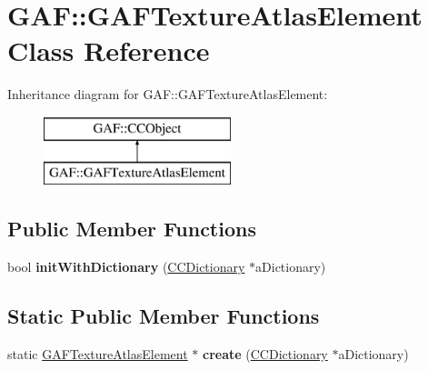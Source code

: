 \hypertarget{class_g_a_f_1_1_g_a_f_texture_atlas_element}{\section{G\-A\-F\-:\-:G\-A\-F\-Texture\-Atlas\-Element Class Reference}
\label{class_g_a_f_1_1_g_a_f_texture_atlas_element}
}
Inheritance diagram for G\-A\-F\-:\-:G\-A\-F\-Texture\-Atlas\-Element\-:\begin{figure}[H]
\begin{center}
\leavevmode
\includegraphics[height=2.000000cm]{class_g_a_f_1_1_g_a_f_texture_atlas_element}
\end{center}
\end{figure}
\subsection*{Public Member Functions}
\begin{DoxyCompactItemize}
\item 
\hypertarget{class_g_a_f_1_1_g_a_f_texture_atlas_element_ace1051e2a8d8a2640b75970bc6ee3499}{bool {\bfseries init\-With\-Dictionary} (\hyperlink{class_g_a_f_1_1_c_c_dictionary}{C\-C\-Dictionary} $\ast$a\-Dictionary)}\label{class_g_a_f_1_1_g_a_f_texture_atlas_element_ace1051e2a8d8a2640b75970bc6ee3499}

\end{DoxyCompactItemize}
\subsection*{Static Public Member Functions}
\begin{DoxyCompactItemize}
\item 
\hypertarget{class_g_a_f_1_1_g_a_f_texture_atlas_element_af3b864b9aea64b04dff34b076dec085a}{static \hyperlink{class_g_a_f_1_1_g_a_f_texture_atlas_element}{G\-A\-F\-Texture\-Atlas\-Element} $\ast$ {\bfseries create} (\hyperlink{class_g_a_f_1_1_c_c_dictionary}{C\-C\-Dictionary} $\ast$a\-Dictionary)}\label{class_g_a_f_1_1_g_a_f_texture_atlas_element_af3b864b9aea64b04dff34b076dec085a}

\end{DoxyCompactItemize}
